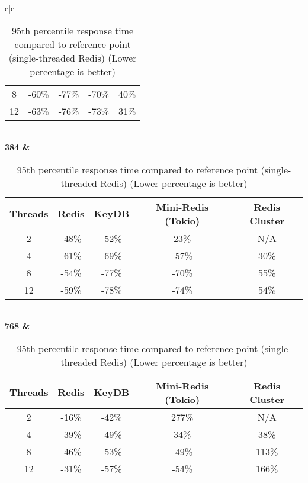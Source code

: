 \begin{center}
\begin{table}
\begin{tabular}{c|c}
\begin{tabular}{c|cccc}
                8 &  -60\% &  -77\% &               -70\% &           40\% \\
               12 &  -63\% &  -76\% &               -73\% &           31\% \\
                \bottomrule
            \end{tabular} \\
            \bf{384} & \begin{tabular}{c|cccc}
                \toprule
                Threads & Redis & KeyDB & Mini-Redis (Tokio) & Redis Cluster \\
                \midrule
                2 &  -48\% &  -52\% &                23\% &           N/A \\
                4 &  -61\% &  -69\% &               -57\% &           30\% \\
                8 &  -54\% &  -77\% &               -70\% &           55\% \\
               12 &  -59\% &  -78\% &               -74\% &           54\% \\
                \bottomrule
            \end{tabular} \\
            \bf{768} & \begin{tabular}{c|cccc}
                \toprule
                Threads & Redis & KeyDB & Mini-Redis (Tokio) & Redis Cluster \\
                \midrule
                2 &  -16\% &  -42\% &               277\% &           N/A \\
                4 &  -39\% &  -49\% &                34\% &           38\% \\
                8 &  -46\% &  -53\% &               -49\% &          113\% \\
               12 &  -31\% &  -57\% &               -54\% &          166\% \\
                \bottomrule
            \end{tabular} \\
            \bottomrule
        \end{tabular}
        \caption{95th percentile response time compared to reference point (single-threaded Redis) (Lower percentage is better)}
        \label{tbl:table_of_figures_95_response_times}
    \end{table}
\end{center}

